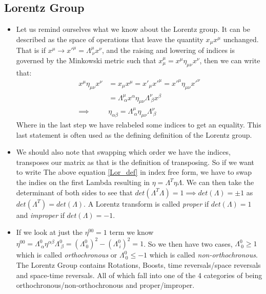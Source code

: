 \documentclass[11pt]{article}
\numberwithin{equation}{section}
\begin{document}
     \subsection{Lorentz Group}
     \begin{itemize}
       \item Let us remind ourselves what we know about the Lorentz group. It can be described as the space of operations that leave the quantity $x_{\mu}x^{\mu}$ unchanged. That is if $x^{\mu} \rightarrow x'^{\mu} = \Lambda^{\mu}_{~\nu}x^{\nu}$, and the raising and lowering of indices is governed by the Minkowski metric such that $x_{\mu}^{\mu} = x^{\mu}\eta_{\mu\nu}x^{\nu}$, then we can write that: 
       \begin{align}
       \label{Lor_def}
          x^{\mu}\eta_{\mu\nu}x^{\nu}& =x_{\mu}x^{\mu}    = x'_{\mu}x'^{\mu}=x'^{\mu}\eta_{\mu\nu}x'^{\nu} \nonumber \\
        &  =  \Lambda^{\mu}_{~\alpha}x^{\alpha}\eta_{\mu\nu}\Lambda^{\nu}_{~\beta}x^{\beta} \nonumber \\
        \implies & \eta_{\alpha\beta} =  \Lambda^{\mu}_{~\alpha}\eta_{\mu\nu}\Lambda^{\nu}_{~\beta}
       \end{align}
       Where in the last step we have relabeled some indices to get an equality. This last statement is often used as the defining definition of the Lorentz group. 

       \item We should also note that swapping which order we have the indices, transposes our matrix as that is the definition of transposing. So if we want to write The above equation \ref{Lor_def} in index free form, we have to swap the indies on the first Lambda resulting in $\eta = \Lambda^{T}\eta\Lambda$. We can then take the determinant of both sides to see that $det(\Lambda^{T}\Lambda) = 1 \implies det(\Lambda)=\pm 1$ as $det(\Lambda^{T})=det(\Lambda)$. A Lorentz transform is called \emph{proper} if $det(\Lambda) =1 $ and \emph{improper} if $det(\Lambda) =-1$.

      \item If we look at just the $\eta^{00}=1$ term we know $\eta^{00} = \Lambda^{0}_{~\alpha}\eta^{\alpha\beta}\Lambda^{0}_{~\beta} = (\Lambda^{0}_{~0})^2-(\Lambda^{0}_{~i})^2 =1$. So we then have two cases, $\Lambda^{0}_{~0} \geq 1$ which is called \emph{orthochronous} or $\Lambda^{0}_{~0}\leq -1$ which is called \emph{non-orthochronous}. The Lorentz Group contains Rotations, Boosts, time reversals/space reversals and space-time reversals. All of which fall into one of the 4 categories of being orthochronous/non-orthochronous and proper/improper. 
     \end{itemize}
\end{document}
